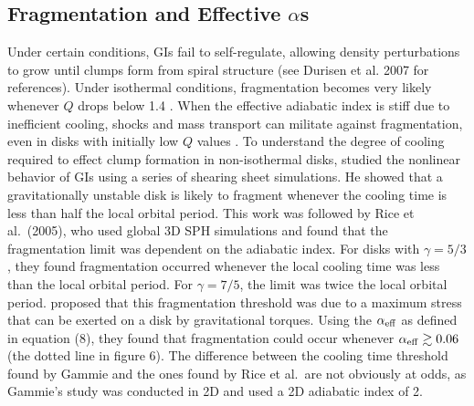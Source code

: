 \documentclass[manuscript]{aastex}
\begin{document}
\subsection{Fragmentation and Effective $\alpha$s}

\noindent

Under certain conditions, GIs fail to self-regulate, allowing density perturbations to grow until clumps form from spiral structure (see Durisen et al. 2007 for references).  Under isothermal conditions, fragmentation becomes very likely whenever $Q$ drops below 1.4 
\citep{tomley1991, tomley1994, nelson1998, mayer2002}. When the effective adiabatic index is stiff due to inefficient cooling, shocks and mass transport can militate against fragmentation, even in disks with initially low $Q$ values \citep[e.g., ][]{boley2008}. To understand the degree of cooling required to effect clump formation in non-isothermal disks, \cite{gammie2001} studied the nonlinear behavior of GIs using a series of shearing sheet simulations.  He showed that  a gravitationally unstable disk is likely to fragment whenever the cooling time is less than half the local orbital period.  This work was followed by Rice et al.~(2005), who used global 3D SPH simulations and found that the fragmentation limit was dependent on the adiabatic index.   For disks with $\gamma=5/3$, they found fragmentation 
occurred whenever the local cooling time was less than the local orbital period. For $\gamma=7/5$, the limit was twice the local orbital period.  \cite{rice2005} proposed that this fragmentation threshold was due to a maximum stress that can  be exerted on a disk by gravitational torques.  Using the $\alpha_{\rm{eff}}$ as defined in equation (8), they found that fragmentation could occur whenever $\alpha_{\rm eff}\gtrsim 0.06$ (the dotted line in figure 6).  The difference between the cooling time threshold found by Gammie and the ones found by Rice et al.~are not obviously at odds, as Gammie's study was conducted in 2D and used a 2D adiabatic index of 2.  
\end{document}
